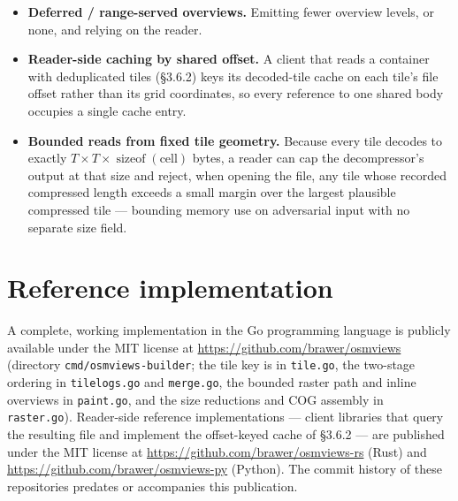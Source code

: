 \documentclass[10pt,twocolumn]{article}
\newcommand{\code}[1]{\texttt{#1}}
\begin{document}
\begin{itemize}
  of it, shard far more finely than the core count and balance the shards
  dynamically. Within a shard, only the pre-order walk and its
  eviction/subsample step are inherently sequential; input decompression (one
  worker per period file) and tile-body compression (one per evicted tile)
  parallelize freely.
\item \textbf{Deferred / range-served overviews.} Emitting fewer overview
  levels, or none, and relying on the reader.
\item \textbf{Reader-side caching by shared offset.} A client that reads a
  container with deduplicated tiles (\S3.6.2) keys its decoded-tile cache on
  each tile's file offset rather than its grid coordinates, so every reference
  to one shared body occupies a single cache entry.
\item \textbf{Bounded reads from fixed tile geometry.} Because every tile
  decodes to exactly $T \times T \times \operatorname{sizeof}(\text{cell})$
  bytes, a reader can cap the decompressor's output at that size and reject,
  when opening the file, any tile whose recorded compressed length exceeds a
  small margin over the largest plausible compressed tile --- bounding memory
  use on adversarial input with no separate size field.
\end{itemize}

\section{Reference implementation}

A complete, working implementation in the Go programming language is publicly
available under the MIT license at \url{https://github.com/brawer/osmviews}
(directory \code{cmd/osmviews-builder}; the tile key is in \code{tile.go}, the
two-stage ordering in \code{tilelogs.go} and \code{merge.go}, the bounded
raster path and inline overviews in \code{paint.go}, and the size reductions
and COG assembly in \code{raster.go}).
Reader-side reference implementations --- client libraries that query the
resulting file and implement the offset-keyed cache of \S3.6.2 --- are
published under the MIT license at
\url{https://github.com/brawer/osmviews-rs} (Rust) and
\url{https://github.com/brawer/osmviews-py} (Python). The commit history of
these repositories predates or accompanies this publication.

{}
\end{document}

